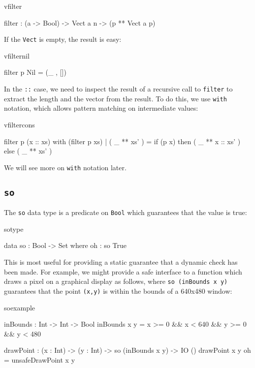 \begin{SaveVerbatim}{vfilter}

filter : (a -> Bool) -> Vect a n -> (p ** Vect a p)

\end{SaveVerbatim}

\noindent
If the \texttt{Vect} is empty, the result is easy:

\begin{SaveVerbatim}{vfilternil}

filter p Nil = (_ , [])

\end{SaveVerbatim}

\noindent
In the \texttt{::} case, we need to inspect the result of a recursive call to 
\texttt{filter} to
extract the length and the vector from the result. To do this, we use \texttt{with}
notation, which allows pattern matching on intermediate values:

\begin{SaveVerbatim}{vfiltercons}

filter p (x :: xs) with (filter p xs)
  | ( _ ** xs' ) = if (p x) then ( _ ** x :: xs' ) else ( _ ** xs' )

\end{SaveVerbatim}

\noindent
We will see more on \texttt{with} notation later.

\subsection{\texttt{so}}

The \texttt{so} data type is a predicate on \texttt{Bool} which guarantees that the
value is true:

\begin{SaveVerbatim}{sotype}

data so : Bool -> Set where
    oh : so True

\end{SaveVerbatim}

\noindent
This is most useful for providing a static guarantee that a dynamic check has been made.
For example, we might provide a safe interface to a function which draws a pixel
on a graphical display as follows, where \texttt{so (inBounds x y)} guarantees that 
the point \texttt{(x,y)} is within the bounds of a 640x480 window:

\begin{SaveVerbatim}{soexample}

inBounds : Int -> Int -> Bool
inBounds x y = x >= 0 && x < 640 && y >= 0 && y < 480

drawPoint : (x : Int) -> (y : Int) -> so (inBounds x y) -> IO ()
drawPoint x y oh = unsafeDrawPoint x y

\end{SaveVerbatim}

